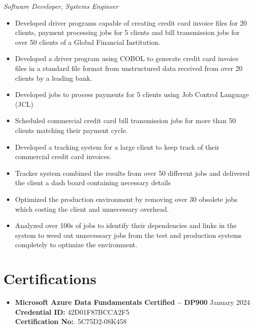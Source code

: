 \documentclass{article}
\begin{document}
\begin{itemize}
		\textit{Software Developer, Systems Engineer}
		\begin{itemize}
			\item Developed driver programs capable of creating credit card invoice files for 20 clients, payment processing jobs for 5 clients and bill transmission jobs for over 50 clients of a Global Financial Institution.
        		\item Developed a driver program using COBOL to generate credit card invoice files in a standard file format from unstructured data received from over 20 clients by a leading bank. 
        		\item Developed jobs to process payments for 5 clients using Job Control Language (JCL)
        		\item Scheduled commercial credit card bill transmission jobs for more than 50 clients matching their payment cycle.
        		\item Developed a tracking system for a large client to keep track of their commercial credit card invoices.
        		\item Tracker system combined the results from over 50 different jobs and delivered the client a dash board containing necessary details
        		\item Optimized the production environment by removing over 30 obsolete jobs which costing the client and unnecessary overhead.
        		\item Analyzed over 100s of jobs to identify their dependencies and links in the system to weed out unnecessary jobs from the test and production systems completely to optimize the environment.
		\end{itemize}
	\end{itemize}
	
	\section*{Certifications \hrulefill\vspace{-.3\baselineskip}}
	\begin{itemize}
		\item \textbf{Microsoft Azure Data Fundamentals Certified – DP900} \hfill January 2024\\
		\textbf{Credential ID:} 42D01F87BCCA2F5\\
		\textbf{Certification No:}. 5C75D2-08K458
	\end{itemize}
	
	
\end{document}
